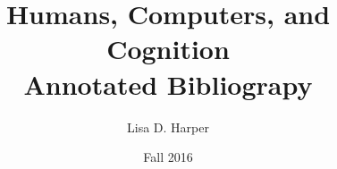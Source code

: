 \documentclass[12pt]{article}
\begin{document}
\title{Humans, Computers, and Cognition \\ Annotated Bibliograpy}
\author{Lisa D. Harper}
\date{Fall 2016}
\maketitle





\end{document}
